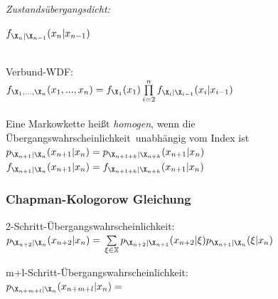 \documentclass[german,color,6pt]{latex4ei/latex4ei_sheet}
\begin{document}
\begin{sectionbox}
	\emph{Zustandsübergangsdicht:} \\
	\centerline{$ f_{\X_{n} | \X_{n-1}}(x_{n} | x_{n-1})$}\\
	
	\qquad Verbund-WDF: \\
	$f_{\X_1,...,\X_n}(x_1,...,x_n)=f_{\X_1}(x_1)\prod\limits_{i=2}^{n}f_{\X_i|\X_{i-1}}(x_i|x_{i-1})$ \\ \\

	
	Eine Markowkette heißt \emph{homogen}, wenn die Übergangswahrscheinlichkeit\ unabhängig vom Index ist \\
	$p_{\X_{n+1} | \X_{n}} (x_{n+1} | x_{n}) = p_{\X_{n+1+k} | \X_{n+k}} (x_{n+1} | x_{n})$ \\
	$f_{\X_{n+1} | \X_{n}} (x_{n+1} | x_{n}) = f_{\X_{n+1+k} | \X_{n+k}} (x_{n+1} | x_{n})$ \\
	

	\subsubsection{Chapman-Kologorow Gleichung}
	2-Schritt-Übergangswahrscheinlichkeit: \\
	 $p_{\X_{n+2}|\X_n}(x_{n+2}|x_n)= \\ \sum\limits_{\xi\in\mathbb{X}}p_{\X_{n+2}|\X_{n+1}}(x_{n+2}|\xi)p_{\X_{n+1}|\X_n}(\xi |x_n)$
	 
	m+l-Schritt-Übergangswahrscheinlichkeit: \\
	$p_{\X_{n+m+l}|\X_n}(x_{n+m+l}|x_n) =$\\
\end{sectionbox}
\end{document}
